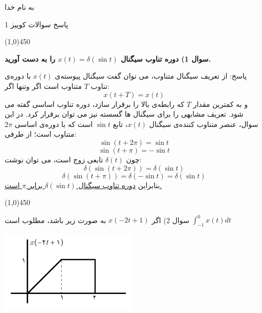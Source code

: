 \documentclass[50pt]{article}
\newcommand{\hl}{
\begin{center}
\line(1,0){450}
\end{center}}
\begin{document}
\setLTR 




\begin{RTL}
\Large{








\begin{center}
به نام خدا

پاسخ سوالات کوییز 1
\end{center}
\hl
\textbf{سوال 1) دوره تناوب سیگنال 
$x(t)=\delta(\sin t)$ را به دست آورید.}

پاسخ: از تعریف سیگنال متناوب، می توان گفت سیگنال پیوسته‌ی $x(t)$ با دوره‌ی تناوب $T$ متناوب است اگر وتنها اگر:
$$
x(t+T)=x(t)
$$
و به کمترین مقدار $T$ که رابطه‌ی بالا را برقرار سازد، دوره تناوب اساسی گفته می شود. تعریف مشابهی را برای سیگنال ها گسسته نیز می توان برقرار کرد. در این سوال، عنصر متناوب کننده‌ی سیگنال $x(t)$، تابع $\sin t$ است که با دوره‌ی اساسی $2\pi$ متناوب است؛ از طرفی:
$$
\sin (t+2\pi)=\sin t
$$
$$
\sin (t+\pi)=-\sin t
$$
چون $\delta(t)$ تابعی زوج است، می توان نوشت:
$$
\delta(\sin (t+2\pi))=\delta(\sin t)
$$
$$
\delta(\sin (t+\pi))=\delta(-\sin t)=\delta(\sin t)
$$
بنابراین 
\underline{دوره تناوب سیگنال $\delta(\sin t)$ برابر $\pi$ است.}
\hl
سوال 2) اگر $x(-2t+1)$ به صورت زیر باشد، مطلوب است 
$\int_{-1}^{0}x(t)dt$
\begin{center}
\includegraphics[width=65mm]{m5}
\end{center}

















}





\end{RTL}
\end{document}
